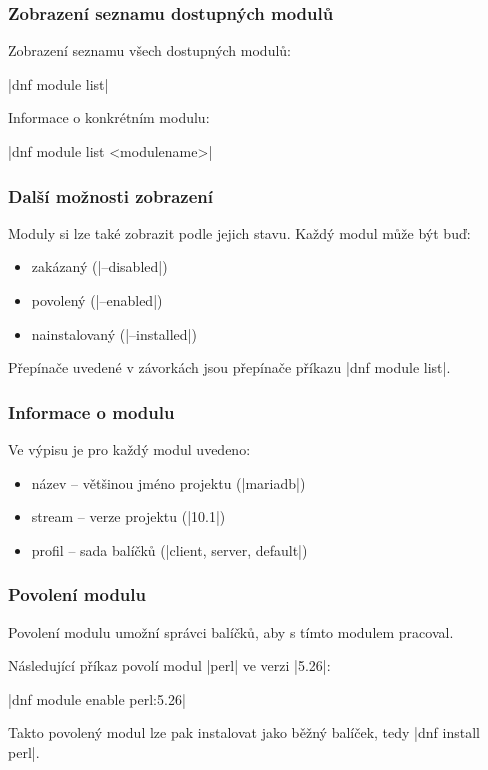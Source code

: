 \documentclass[12pt]{beamer}
\begin{document}
\begin{frame}[fragile]
\frametitle{Zobrazení seznamu dostupných modulů}

Zobrazení seznamu všech dostupných modulů:

\begin{center}
	\tc|dnf module list|
\end{center}

Informace o konkrétním modulu:

\begin{center}
	\tc|dnf module list <modulename>|
\end{center}
\end{frame}

\begin{frame}[fragile]
\frametitle{Další možnosti zobrazení}

Moduly si lze také zobrazit podle jejich stavu. Každý modul může být buď:

\begin{itemize}
	\item zakázaný (\tc|--disabled|)
	\item povolený (\tc|--enabled|)
	\item nainstalovaný (\tc|--installed|)
\end{itemize}

Přepínače uvedené v závorkách jsou přepínače příkazu \tc|dnf module list|.
\end{frame}

\begin{frame}[fragile]
\frametitle{Informace o modulu}
Ve výpisu je pro každý modul uvedeno:

\begin{itemize}
	\item název -- většinou jméno projektu (\tc|mariadb|)
	\item stream -- verze projektu (\tc|10.1|)
	\item profil -- sada balíčků (\tc|client, server, default|)
\end{itemize}
\end{frame}

\begin{frame}[fragile]
\frametitle{Povolení modulu}
Povolení modulu umožní správci balíčků, aby s tímto modulem pracoval. 

Následující příkaz povolí modul \tc|perl| ve verzi \tc|5.26|:

\begin{center}
	\tc|dnf module enable perl:5.26|
\end{center}

Takto povolený modul lze pak instalovat jako běžný balíček, tedy \tc|dnf install perl|.
\end{frame}
\end{document}
